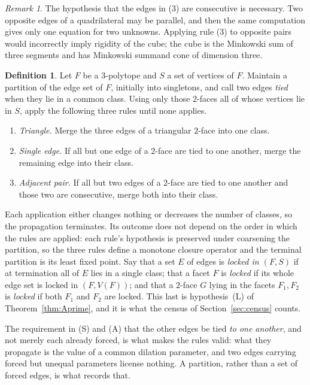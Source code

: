 \documentclass[11pt]{amsart}
\theoremstyle{definition}
\newtheorem{definition}[theorem]{Definition}
\theoremstyle{remark}
\newtheorem{remark}[theorem]{Remark}
\theoremstyle{plain}
\begin{document}
\begin{remark}\label{rem:adjacent}
The hypothesis that the edges in (3) are consecutive is necessary.
Two opposite
edges of a quadrilateral may be parallel, and then the same computation gives
only one equation for two unknowns.  Applying rule (3) to opposite
pairs would incorrectly imply rigidity of the cube; the cube is the Minkowski sum of three
segments and has Minkowski summand cone of dimension three.
\end{remark}

\begin{definition}\label{def:locked}
Let $F$ be a $3$-polytope and $S$ a set of vertices of $F$.  Maintain a
partition of the edge set of $F$, initially into singletons, and call two edges
\emph{tied} when they lie in a common class.  Using only those $2$-faces all of
whose vertices lie in $S$, apply the following three rules until none applies.
\begin{enumerate}
\item[(T)] \emph{Triangle.}  Merge the three edges of a triangular $2$-face into
  one class.
\item[(S)] \emph{Single edge.}  If all but one edge of a $2$-face are tied to
  one another, merge the remaining edge into their class.
\item[(A)] \emph{Adjacent pair.}  If all but two edges of a $2$-face are tied to
  one another and those two are consecutive, merge both into their class.
\end{enumerate}
Each application either changes nothing or decreases the number of classes, so
the propagation terminates.  Its outcome does not depend on the order in which
the rules are applied: each rule's hypothesis is preserved under coarsening the
partition, so the three rules define a monotone closure operator and the
terminal partition is its least fixed point.  Say that a set $E$ of edges is \emph{locked in $(F,S)$} if at
termination all of $E$ lies in a single class; that a facet $F$ is
\emph{locked} if its whole edge set is locked in $(F,V(F))$; and that a
$2$-face $G$ lying in the facets $F_1,F_2$ is \emph{locked} if both $F_1$ and
$F_2$ are locked.  This last is hypothesis~{\rm(L)} of
Theorem~\ref{thm:Aprime}, and it is what the census of
Section~\ref{sec:census} counts.
\end{definition}

The requirement in (S) and (A) that the other edges be tied \emph{to one
another}, and not merely each already forced, is what makes the rules valid:
what they propagate is the value of a common dilation parameter, and two edges
carrying forced but unequal parameters license nothing.  A partition, rather
than a set of forced edges, is what records that.
\end{document}
